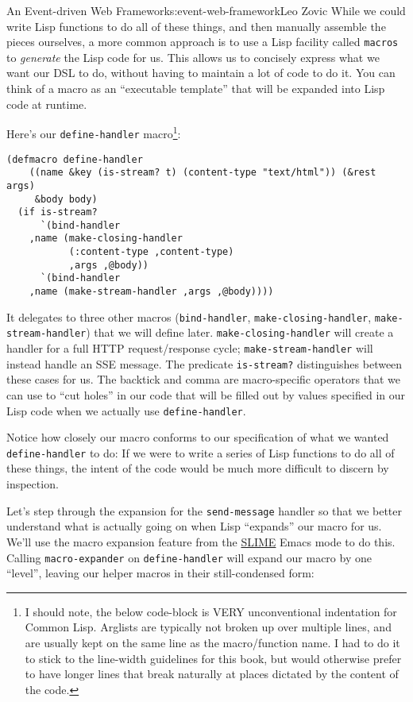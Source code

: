 \begin{aosachapter}{An Event-driven Web Framework}{s:event-web-framework}{Leo Zovic}
While we could write Lisp functions to do all of these things, and then
manually assemble the pieces ourselves, a more common approach is to use
a Lisp facility called \texttt{macros} to \emph{generate} the Lisp code
for us. This allows us to concisely express what we want our DSL to do,
without having to maintain a lot of code to do it. You can think of a
macro as an ``executable template'' that will be expanded into Lisp code
at runtime.

Here's our \texttt{define-handler} macro\footnote{I should note, the
  below code-block is VERY unconventional indentation for Common Lisp.
  Arglists are typically not broken up over multiple lines, and are
  usually kept on the same line as the macro/function name. I had to do
  it to stick to the line-width guidelines for this book, but would
  otherwise prefer to have longer lines that break naturally at places
  dictated by the content of the code.}:

\begin{verbatim}
(defmacro define-handler
    ((name &key (is-stream? t) (content-type "text/html")) (&rest args)
     &body body)
  (if is-stream?
      `(bind-handler
    ,name (make-closing-handler
           (:content-type ,content-type)
           ,args ,@body))
      `(bind-handler
    ,name (make-stream-handler ,args ,@body))))
\end{verbatim}

It delegates to three other macros (\texttt{bind-handler},
\texttt{make-closing-handler}, \newline \texttt{make-stream-handler})
that we will define later. \texttt{make-closing-handler} will create a
handler for a full HTTP request/response cycle;
\texttt{make-stream-handler} will instead handle an SSE message. The
predicate \texttt{is-stream?} distinguishes between these cases for us.
The backtick and comma are macro-specific operators that we can use to
``cut holes'' in our code that will be filled out by values specified in
our Lisp code when we actually use \texttt{define-handler}.

Notice how closely our macro conforms to our specification of what we
wanted \texttt{define-handler} to do: If we were to write a series of
Lisp functions to do all of these things, the intent of the code would
be much more difficult to discern by inspection.

\label{expanding-a-handler}

Let's step through the expansion for the \texttt{send-message} handler
so that we better understand what is actually going on when Lisp
``expands'' our macro for us. We'll use the macro expansion feature from
the \href{https://common-lisp.net/project/slime/}{SLIME} Emacs mode to
do this. Calling \texttt{macro-expander} on \texttt{define-handler} will
expand our macro by one ``level'', leaving our helper macros in their
still-condensed form:


\end{aosachapter}

